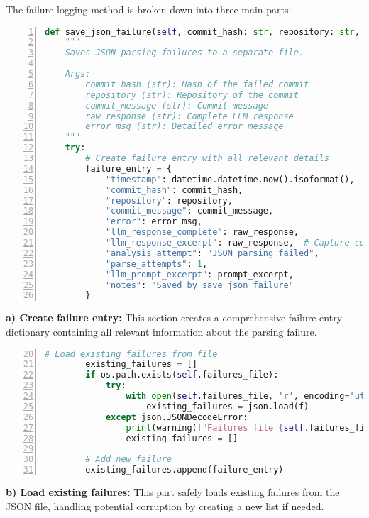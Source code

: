 The failure logging method is broken down into three main parts:

\begin{lstlisting}[language=Python, numbers=left]
def save_json_failure(self, commit_hash: str, repository: str, commit_message: str, raw_response: str, error_msg: str, prompt_excerpt: str | None = None):
    """
    Saves JSON parsing failures to a separate file.
    
    Args:
        commit_hash (str): Hash of the failed commit
        repository (str): Repository of the commit
        commit_message (str): Commit message
        raw_response (str): Complete LLM response
        error_msg (str): Detailed error message
    """
    try:
        # Create failure entry with all relevant details
        failure_entry = {
            "timestamp": datetime.datetime.now().isoformat(),
            "commit_hash": commit_hash,
            "repository": repository,
            "commit_message": commit_message,
            "error": error_msg,
            "llm_response_complete": raw_response,
            "llm_response_excerpt": raw_response,  # Capture complete response without truncation
            "analysis_attempt": "JSON parsing failed",
            "parse_attempts": 1,
            "llm_prompt_excerpt": prompt_excerpt,
            "notes": "Saved by save_json_failure"
        }
\end{lstlisting}

\textbf{a) Create failure entry:} This section creates a comprehensive failure entry dictionary containing all relevant information about the parsing failure.

\begin{lstlisting}[language=Python, numbers=left, firstnumber=20]
        # Load existing failures from file
        existing_failures = []
        if os.path.exists(self.failures_file):
            try:
                with open(self.failures_file, 'r', encoding='utf-8') as f:
                    existing_failures = json.load(f)
            except json.JSONDecodeError:
                print(warning(f"Failures file {self.failures_file} corrupted, creating new"))
                existing_failures = []
        
        # Add new failure
        existing_failures.append(failure_entry)
\end{lstlisting}

\textbf{b) Load existing failures:} This part safely loads existing failures from the JSON file, handling potential corruption by creating a new list if needed.

